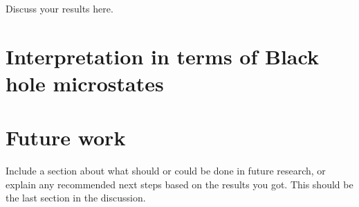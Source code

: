 
Discuss your results here.

\section{Interpretation in terms of Black hole microstates}

\section{Future work}


Include a section about what should or could be done in future research, or explain any recommended next steps based on the results you got. This should be the last section in the discussion.